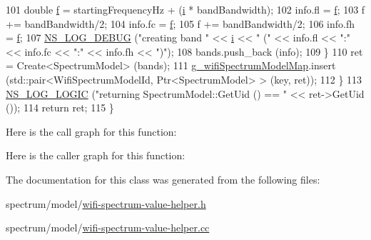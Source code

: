 \begin{DoxyCode}
101           \textcolor{keywordtype}{double} \hyperlink{buildings__pathloss_8m_aa52d3a6e3de5a80a97c12364caeaa125}{f} = startingFrequencyHz + (\hyperlink{bernuolliDistribution_8m_a6f6ccfcf58b31cb6412107d9d5281426}{i} * bandBandwidth);
102           info.fl = \hyperlink{buildings__pathloss_8m_aa52d3a6e3de5a80a97c12364caeaa125}{f};
103           f += bandBandwidth/2;
104           info.fc = \hyperlink{buildings__pathloss_8m_aa52d3a6e3de5a80a97c12364caeaa125}{f};
105           f += bandBandwidth/2;
106           info.fh = \hyperlink{buildings__pathloss_8m_aa52d3a6e3de5a80a97c12364caeaa125}{f};
107           \hyperlink{group__logging_ga413f1886406d49f59a6a0a89b77b4d0a}{NS\_LOG\_DEBUG} (\textcolor{stringliteral}{"creating band "} << \hyperlink{bernuolliDistribution_8m_a6f6ccfcf58b31cb6412107d9d5281426}{i} << \textcolor{stringliteral}{" ("} << info.fl << \textcolor{stringliteral}{":"} << info.fc << \textcolor{stringliteral}{":"} << 
      info.fh << \textcolor{stringliteral}{")"});
108           bands.push\_back (info);
109         \}
110       ret = Create<SpectrumModel> (bands);
111       \hyperlink{namespacens3_a973157d1ac2cfc5e6b3d60be8a7d721d}{g\_wifiSpectrumModelMap}.insert (std::pair<WifiSpectrumModelId, 
      Ptr<SpectrumModel> > (key, ret));
112     \}
113   \hyperlink{group__logging_ga88acd260151caf2db9c0fc84997f45ce}{NS\_LOG\_LOGIC} (\textcolor{stringliteral}{"returning SpectrumModel::GetUid () == "} << ret->GetUid ());
114   \textcolor{keywordflow}{return} ret;
115 \}
\end{DoxyCode}


Here is the call graph for this function\+:




Here is the caller graph for this function\+:




The documentation for this class was generated from the following files\+:\begin{DoxyCompactItemize}
\item 
spectrum/model/\hyperlink{wifi-spectrum-value-helper_8h}{wifi-\/spectrum-\/value-\/helper.\+h}\item 
spectrum/model/\hyperlink{wifi-spectrum-value-helper_8cc}{wifi-\/spectrum-\/value-\/helper.\+cc}\end{DoxyCompactItemize}
